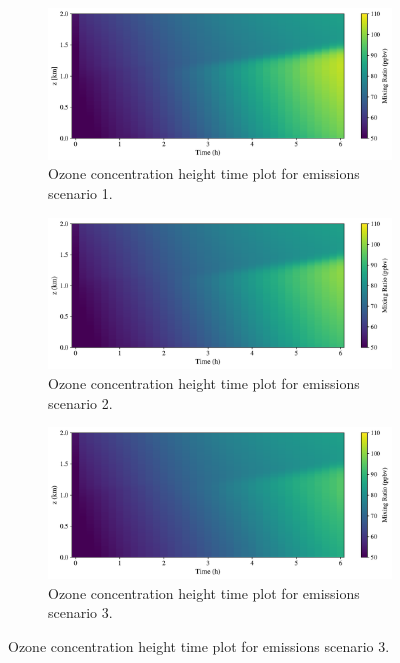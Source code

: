 \begin{figure}[h]
  \centering
  \begin{subfigure}
    \centering
    \includegraphics[width=.8\textwidth]{figures/chapter4/height-time-o3-fx1fy0.pdf}
    \caption{Ozone concentration height time plot for emissions scenario 1.}
  \end{subfigure}
     \vspace*{5mm} 
  \begin{subfigure}
    \centering
    \includegraphics[width=.8\textwidth]{figures/chapter4/height-time-o3-road-10x.pdf}
    \caption{Ozone concentration height time plot for emissions scenario 2.}
  \end{subfigure}
   \vspace*{5mm} 
  \begin{subfigure}
    \centering
    \includegraphics[width=.8\textwidth]{figures/chapter4/height-time-o3-point-source-1x1.pdf}
    \caption{Ozone concentration height time plot for emissions scenario 3.}
  \end{subfigure}
\end{figure}

